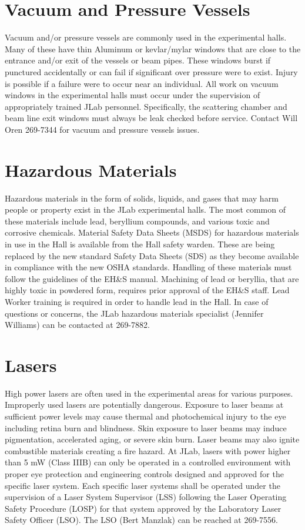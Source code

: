 \section{Vacuum and Pressure Vessels}

	Vacuum and/or pressure vessels are commonly used in the experimental halls. Many 
of these have thin Aluminum or kevlar/mylar windows that are close to the entrance 
and/or exit of the vessels or beam pipes. These windows burst if punctured accidentally 
or can fail if significant over pressure were to exist. Injury is possible if a failure 
were to occur near an individual. All work on vacuum windows in the experimental halls 
must occur under the supervision of appropriately trained JLab personnel. Specifically, 
the scattering chamber and beam line exit windows must always be leak checked before service. 
Contact Will Oren 269-7344 for vacuum and pressure vessels issues.

\section{Hazardous Materials}

	Hazardous materials in the form of solids, liquids, and gases that may harm people 
or property exist in the JLab experimental halls. The most common of these materials include 
lead, beryllium compounds, and various toxic and corrosive chemicals. 
Material Safety Data Sheets (MSDS) for hazardous materials 
in use in the Hall is available from the Hall safety warden.  These are being replaced by the new standard
Safety Data Sheets (SDS) as they become available in compliance with the new OSHA standards.    Handling of these materials 
must follow the guidelines of the EH\&S manual. Machining of lead or beryllia, that 
are highly toxic in powdered form, requires prior approval of the EH\&S staff. 
Lead Worker training is required in order to handle lead in the Hall. 
In case of questions or concerns, the JLab hazardous materials specialist (Jennifer Williams) can be contacted at 269-7882.

\section{Lasers}

	High power lasers are often used in the experimental areas for various purposes. Improperly 
used lasers are potentially dangerous. Exposure to laser beams at sufficient power levels 
may cause thermal and photochemical injury to the eye including retina burn and blindness. 
Skin exposure to laser beams may induce pigmentation, accelerated aging, or severe skin burn. 
Laser beams may also ignite combustible materials creating a fire hazard. At JLab, lasers with power 
higher than 5 mW (Class IIIB) can only be operated in a controlled environment with proper eye protection 
and engineering controls designed and approved for the specific laser system. Each specific laser systems 
shall be operated under the supervision of a Laser System Supervisor (LSS) following the Laser 
Operating Safety Procedure (LOSP) for that system approved by the Laboratory Laser Safety Officer (LSO). 
The LSO (Bert Manzlak) can be reached at 269-7556.

